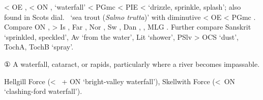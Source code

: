 \documentclass[12pt,letterpaper,oneside,article,draft]{memoir}
\begin{document}
\begin{Lemma}
\begin{Also}
\end{Also}
\begin{Etymology}
	< OE ,  < ON ,  ‘waterfall’ < PGmc 
		< PIE  <  ‘drizzle, sprinkle, splash’;
		also found in Scots dial.\  ‘sea trout (\textit{Salmo trutta})’
			with diminutive  < OE  < PGmc .
	Compare
	ON ,  > Is , Far , Nor , Sw , Dan ,
		, MLG .
	Further compare
	Sanskrit   ‘sprinkled, speckled’,
	Av   ‘from the water’,
	Lit  ‘shower’,
	PSlv  > OCS   ‘dust’,
	TochA, TochB  ‘spray’.
\end{Etymology}
\begin{Definitions}
	① A waterfall, cataract, or rapids, particularly where a river becomes impassable.
\end{Definitions}
\begin{Examples}
	Hellgill Force (<~ + ON  ‘bright-valley waterfall’),
	Skellwith Force (<~ON   ‘clashing-ford waterfall’).
\end{Examples}
\end{Lemma}
\end{document}
